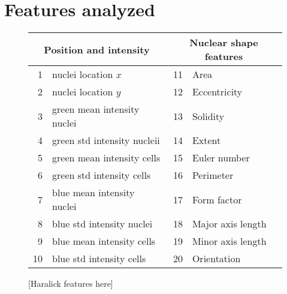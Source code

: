 \documentclass[oneside, a4paper, draft]{memoir} %
\begin{document}
\chapter{Features analyzed}\label{app:featurelist}
\begin{figure}[here]

\begin{tabularx}{300pt}{| rX | rX|}
	\hline
	\multicolumn{2}{|c|}{\textbf{Position and intensity}} & \multicolumn{2}{c|}{\textbf{Nuclear shape features}}\\
	\hline
	1 & nuclei location $x$ & 11 & Area\\
	2 & nuclei location $y$ & 12 & Eccentricity\\

	3 & green mean intensity nuclei & 13 & Solidity\\
	4 & green std intensity nucleii & 14 & Extent\\

	5 & green mean intensity cells & 15 & Euler number\\
	6 & green std intensity cells & 16 & Perimeter\\

	7 & blue mean intensity nuclei & 17 & Form factor\\
	8 & blue std intensity nuclei & 18 & Major axis length\\

	9 & blue mean intensity cells & 19 & Minor axis length\\
	10 & blue std intensity cells & 20 & Orientation\\
	\hline
\end{tabularx}

\vspace*{0.4cm}
[Haralick features here]


\end{figure}
\end{document}
